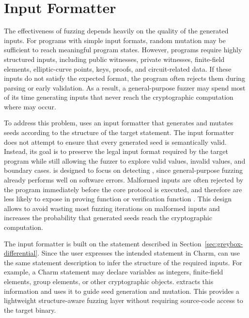 \section{Input Formatter}
\label{sec:greybox-input_formatter}

The effectiveness of fuzzing depends heavily on the quality of the generated inputs. For programs with simple input formats, random mutation may be sufficient to reach meaningful program states. However, \zksnark programs require highly structured inputs, including public witnesses, private witnesses, finite-field elements, elliptic-curve points, keys, proofs, and circuit-related data. If these inputs do not satisfy the expected format, the program often rejects them during parsing or early validation. As a result, a general-purpose fuzzer may spend most of its time generating inputs that never reach the cryptographic computation where \logicerror may occur.

To address this problem, \greyboxfuzz uses an input formatter that generates and mutates seeds according to the structure of the target statement. The input formatter does not attempt to ensure that every generated seed is semantically valid. Instead, its goal is to preserve the legal input format required by the target \zksnark program while still allowing the fuzzer to explore valid values, invalid values, and boundary cases. \greyboxfuzz is designed to focus on detecting \logicerror, since general-purpose fuzzing already performs well on software errors. Malformed inputs are often rejected by the \zksnark program immediately before the core protocol is executed, and therefore are less likely to expose \logicerror in proving function \pfunc or verification function \vfunc. This design allows \greyboxfuzz to avoid wasting most fuzzing iterations on malformed inputs and increases the probability that generated seeds reach the cryptographic computation.

The input formatter is built on the statement described in Section~\ref{sec:greybox-differential}. Since the user expresses the intended statement in Charm, \greyboxfuzz can use the same statement description to infer the structure of the required inputs. For example, a Charm statement may declare variables as integers, finite-field elements, group elements, or other cryptographic objects. \greyboxfuzz extracts this information and uses it to guide seed generation and mutation. This provides a lightweight structure-aware fuzzing layer without requiring source-code access to the target \zksnark binary.

